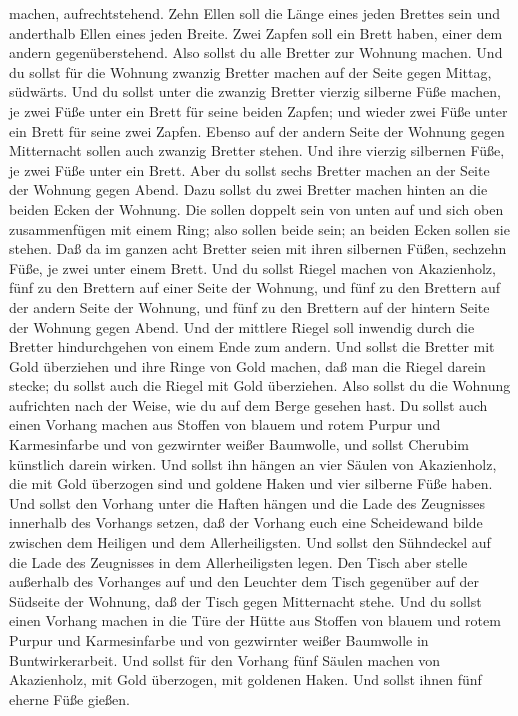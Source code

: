 machen, aufrechtstehend.  Zehn Ellen soll die Länge eines
jeden Brettes sein und anderthalb Ellen eines jeden Breite.
 Zwei Zapfen soll ein Brett haben, einer dem andern
gegenüberstehend. Also sollst du alle Bretter zur Wohnung machen.
 Und du sollst für die Wohnung zwanzig Bretter machen auf
der Seite gegen Mittag, südwärts.  Und du sollst unter
die zwanzig Bretter vierzig silberne Füße machen, je zwei Füße unter ein
Brett für seine beiden Zapfen; und wieder zwei Füße unter ein Brett für
seine zwei Zapfen.  Ebenso auf der andern Seite der
Wohnung gegen Mitternacht sollen auch zwanzig Bretter stehen.
 Und ihre vierzig silbernen Füße, je zwei Füße unter ein
Brett.  Aber du sollst sechs Bretter machen an der Seite
der Wohnung gegen Abend.  Dazu sollst du zwei Bretter
machen hinten an die beiden Ecken der Wohnung.  Die
sollen doppelt sein von unten auf und sich oben zusammenfügen mit einem
Ring; also sollen beide sein; an beiden Ecken sollen sie stehen.
 Daß da im ganzen acht Bretter seien mit ihren silbernen
Füßen, sechzehn Füße, je zwei unter einem Brett.  Und du
sollst Riegel machen von Akazienholz, fünf zu den Brettern auf einer
Seite der Wohnung,  und fünf zu den Brettern auf der
andern Seite der Wohnung, und fünf zu den Brettern auf der hintern Seite
der Wohnung gegen Abend.  Und der mittlere Riegel soll
inwendig durch die Bretter hindurchgehen von einem Ende zum andern.
 Und sollst die Bretter mit Gold überziehen und ihre
Ringe von Gold machen, daß man die Riegel darein stecke; du sollst auch
die Riegel mit Gold überziehen.  Also sollst du die
Wohnung aufrichten nach der Weise, wie du auf dem Berge gesehen hast.
 Du sollst auch einen Vorhang machen aus Stoffen von
blauem und rotem Purpur und Karmesinfarbe und von gezwirnter weißer
Baumwolle, und sollst Cherubim künstlich darein wirken. 
Und sollst ihn hängen an vier Säulen von Akazienholz, die mit Gold
überzogen sind und goldene Haken und vier silberne Füße haben.
 Und sollst den Vorhang unter die Haften hängen und die
Lade des Zeugnisses innerhalb des Vorhangs setzen, daß der Vorhang euch
eine Scheidewand bilde zwischen dem Heiligen und dem Allerheiligsten.
 Und sollst den Sühndeckel auf die Lade des Zeugnisses in
dem Allerheiligsten legen.  Den Tisch aber stelle
außerhalb des Vorhanges auf und den Leuchter dem Tisch gegenüber auf der
Südseite der Wohnung, daß der Tisch gegen Mitternacht stehe.
 Und du sollst einen Vorhang machen in die Türe der Hütte
aus Stoffen von blauem und rotem Purpur und Karmesinfarbe und von
gezwirnter weißer Baumwolle in Buntwirkerarbeit.  Und
sollst für den Vorhang fünf Säulen machen von Akazienholz, mit Gold
überzogen, mit goldenen Haken. Und sollst ihnen fünf eherne Füße gießen.

